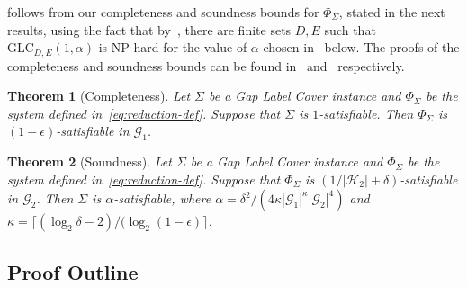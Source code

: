 \documentclass[a4paper,11pt]{article}
\newtheorem{theorem}{Theorem}[section]
\theoremstyle{definition}
\newcommand{\gr}{\mathscr{G}}
\newcommand{\sgr}{\mathscr{H}}
\newcommand{\glc}{\mathrm{GLC}}
\begin{document}
 follows from our completeness and soundness bounds for 
    $\Phi_\Sigma$, stated in the next results, using the fact that
    by~, there are finite sets $D,E$ such that
    $\glc_{D,E}(1,\alpha)$ is NP-hard for the value of $\alpha$ chosen
    in~ below. The proofs of the completeness and soundness bounds can be found in~ and~ respectively. 

\begin{theorem}[Completeness]
\label{th:completeness}
    Let $\Sigma$ be a Gap Label Cover instance and $\Phi_\Sigma$ be the system defined in~\eqref{eq:reduction-def}. Suppose that $\Sigma$ is $1$-satisfiable. Then $\Phi_\Sigma$ is $(1 -\epsilon)$-satisfiable in $\gr_1$.
\end{theorem}

\begin{theorem}[Soundness]
\label{th:soundness}
 Let $\Sigma$ be a Gap Label Cover instance and $\Phi_\Sigma$ be the system defined 
 in~\eqref{eq:reduction-def}. Suppose that $\Phi_\Sigma$ is $(1/|\sgr_2| + \delta)$-satisfiable in $\gr_2$. Then $\Sigma$ is $\alpha$-satisfiable, where $\alpha=\delta^2/(4\kappa|\gr_1|^\kappa|\gr_2|^{4})$ and $\kappa=\lceil(\log_2\delta -2)/(\log_2(1-\epsilon)\rceil$. 
 \end{theorem}

\subsection{Proof Outline} \label{sec:outline}
\end{document}
